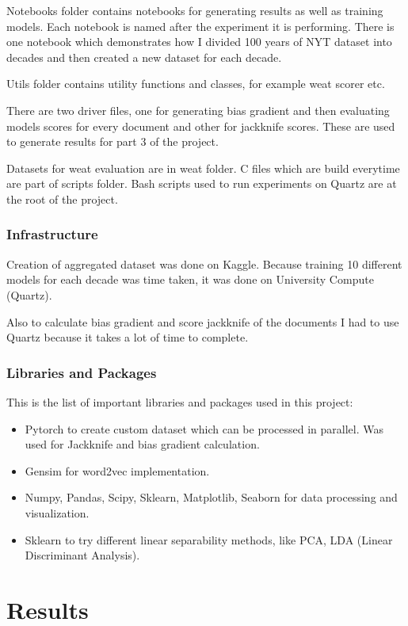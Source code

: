 \documentclass{article}
\begin{document}
Notebooks folder contains notebooks for generating results as well as training models. Each notebook is named after the experiment it is performing. There is one notebook which demonstrates how I divided 100 years of NYT dataset into decades and then created a new dataset for each decade.

Utils folder contains utility functions and classes, for example weat scorer etc.

There are two driver files, one for generating bias gradient and then evaluating models scores for every document and other for jackknife scores. These are used to generate results for part 3 of the project.

Datasets for weat evaluation are in weat folder. C files which are build everytime are part of scripts folder. Bash scripts used to run experiments on Quartz are at the root of the project.
\subsubsection{Infrastructure}

Creation of aggregated dataset was done on Kaggle. Because training 10 different models for each decade was time taken, it was done on University Compute (Quartz).

Also to calculate bias gradient and score jackknife  of the documents I had to use Quartz because it takes a lot of time to complete.

\subsubsection{Libraries and Packages}

This is the list of important libraries and packages used in this project:
\begin{itemize}
    \item Pytorch to create custom dataset which can be processed in parallel. Was used for Jackknife and bias gradient calculation.
    \item Gensim for word2vec implementation.
    \item Numpy, Pandas, Scipy, Sklearn, Matplotlib, Seaborn for data processing and visualization.
    \item Sklearn to try different linear separability methods, like PCA, LDA (Linear Discriminant Analysis).

\end{itemize}


\section{Results}
\end{document}
